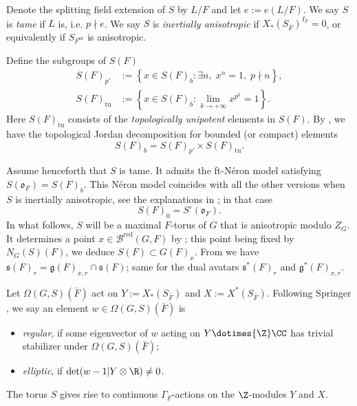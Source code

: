 \documentclass[a4paper,10pt]{article}
\begin{document}
Denote the splitting field extension of $S$ by $L/F$ and let $e := e(L/F)$. We say $S$ is \emph{tame} if $L$ is, i.e. $p \nmid e$. We say $S$ is \emph{inertially anisotropic} if $X_*(S_{\bar{F}})^{I_F} = 0$, or equivalently if $S_{F^{\text{nr}}}$ is anisotropic. 

Define the subgroups of $S(F)$
\begin{align*}
	S(F)_{p'} & := \left\{ x \in S(F)_b: \exists n, \; x^n = 1, \; p \nmid n \right\}, \\
	S(F)_\text{tu} & := \left\{ x \in S(F)_b: \lim_{k \to +\infty} x^{p^k} = 1 \right\}.
\end{align*}
Here $S(F)_\text{tu}$ consists of the \emph{topologically unipotent} elements in $S(F)$. By \cite[5.2]{Wa08}, we have the topological Jordan decomposition for bounded (or compact) elements 
\begin{equation}\label{eqn:S-Jordan}
	S(F)_b = S(F)_{p'} \times S(F)_\text{tu}.
\end{equation}

Assume henceforth that $S$ is tame. It admits the ft-Néron model satisfying $S(\mathfrak{o}_F) = S(F)_b$. This Néron model coincides with all the other versions when $S$ is inertially anisotropic, see the explanations in \cite[p.50]{Kal13}; in that case
\[ S(F)_0 = S^\circ(\mathfrak{o}_F). \]
In what follows, $S$ will be a maximal $F$-torus of $G$ that is anisotropic modulo $Z_G$. It determines a point $x \in \mathcal{B}^\text{red}(G,F)$ by \cite[Remark 3]{Pra01}; this point being fixed by $N_G(S)(F)$, we deduce $S(F) \subset G(F)_x$. From \cite[Proposition 1.9.1]{Adl98} we have $\mathfrak{s}(F)_r = \mathfrak{g}(F)_{x,r} \cap \mathfrak{s}(F)$; same for the dual avatars $\mathfrak{s}^*(F)_r$ and $\mathfrak{g}^*(F)_{x,r}$.

Let $\Omega(G, S)(\bar{F})$ act on $Y := X_*(S_{\bar{F}})$ and $X := X^*(S_{\bar{F}})$. Following Springer \cite{Spr74}, we say an element $w \in \Omega(G,S)(\bar{F})$ is
\begin{itemize}
	\item \emph{regular}, if some eigenvector of $w$ acting on $Y \dotimes{\Z} \CC$ has trivial stabilizer under $\Omega(G,S)(\bar{F})$;
	\item \emph{elliptic}, if $\det( w-1 | Y \otimes \R) \neq 0$.
\end{itemize}
The torus $S$ gives rise to continuous $\Gamma_F$-actions on the $\Z$-modules $Y$ and $X$.
\end{document}
